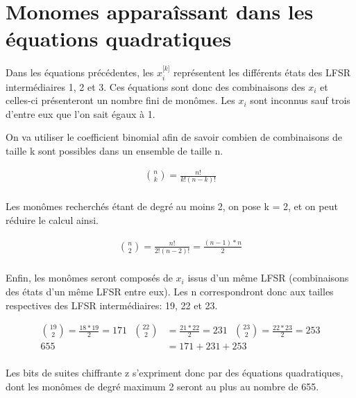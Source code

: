 \section{Monomes apparaîssant dans les équations quadratiques}

Dans les équations précédentes, les $x_i^{\lbrack k \rbrack }$ représentent les différents états des LFSR intermédiaires 1, 2 et 3. Ces équations sont donc des combinaisons des $x_i$ et celles-ci présenteront un nombre fini de monômes. Les $x_i$ sont inconnus sauf trois d'entre eux que l'on sait égaux à 1.

On va utiliser le coefficient binomial afin de savoir combien de combinaisons de taille k sont possibles dans un ensemble de taille n.

\begin{equation}
  \begin{aligned}
    \binom{n}{k}=\frac{n!}{k!(n-k)!}\\
  \end{aligned}
\end{equation}

Les monômes recherchés étant de degré au moins 2, on pose k = 2, et on peut réduire le calcul ainsi.

\begin{equation}
  \begin{aligned}
    \binom{n}{2}=\frac{n!}{2!(n-2)!}=\frac{(n-1)*n}{2}\\
  \end{aligned}
\end{equation}

Enfin, les monômes seront composés de $x_i$ issus d'un même LFSR (combinaisons des états d'un même LFSR entre eux). Les n correspondront donc aux tailles respectives des LFSR intermédiaires: 19, 22 et 23.

\begin{equation}
  \begin{aligned}
    \binom{19}{2}=\frac{18*19}{2}=171\ \ \ \binom{22}{2}&=\frac{21*22}{2}=231\ \ \ \binom{23}{2}=\frac{22*23}{2}=253\\
    655&=171+231+253\\
  \end{aligned}
\end{equation}

Les bits de suites chiffrante z s'expriment donc par des équations quadratiques, dont les monômes de degré maximum 2 seront au plus au nombre de 655.
